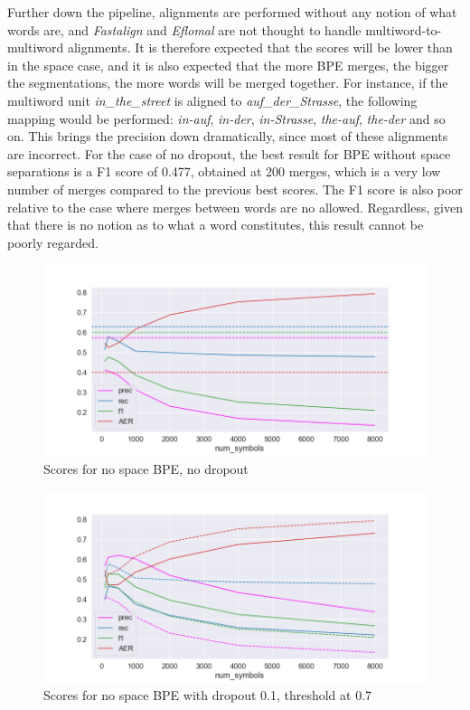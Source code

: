 Further down the pipeline, alignments are performed without any notion of what words are, and \emph{Fastalign} and \emph{Eflomal} are not thought to handle multiword-to-multiword alignments. It is therefore expected that the scores will be lower than in the space case, and it is also expected that the more BPE merges, the bigger the segmentations, the more words will be merged together. For instance, if the multiword unit \emph{in\_the\_street} is aligned to \emph{auf\_der\_Strasse}, the following mapping would be performed: \emph{in-auf}, \emph{in-der}, \emph{in-Strasse}, \emph{the-auf}, \emph{the-der} and so on. This brings the precision down dramatically, since most of these alignments are incorrect. For the case of no dropout, the best result for BPE without space separations is a F1 score of 0.477, obtained at 200 merges, which is a very low number of merges compared to the previous best scores. The F1 score is also poor relative to the case where merges between words are no allowed. Regardless, given that there is no notion as to what a word constitutes, this result cannot be poorly regarded.

\begin{figure}[!ht]
    \centering
    \includegraphics[width=11.5cm]{../reports/scores_normal_bpe/eng_deu_ns_fastalign.png}
    \caption{Scores for no space BPE, no dropout}
\end{figure}

\begin{figure}[!ht]
    \centering
    \includegraphics[width=11.5cm]{../reports/scores_dropout_bpe/no space/0.1/scores_ns_0.7_thres.png}
    \caption{Scores for no space BPE with dropout 0.1, threshold at 0.7}
\end{figure}

